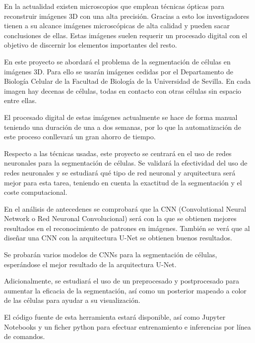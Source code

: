 
En la actualidad existen microscopios que emplean técnicas ópticas para reconstruir imágenes 3D con una alta precisión. Gracias a esto los investigadores tienen a su alcance imágenes microscópicas de alta calidad y pueden sacar conclusiones de ellas. Estas imágenes suelen requerir un procesado digital con el objetivo de discernir los elementos importantes del resto.

En este proyecto se abordará el problema de la segmentación de células en imágenes 3D. Para ello se usarán imágenes  cedidas por el Departamento de Biología Celular de la Facultad de Biología de la Universidad de Sevilla. En cada imagen hay decenas de células, todas en contacto con otras células sin espacio entre ellas.

El procesado digital de estas imágenes actualmente se hace de forma manual teniendo una duración de una a dos semanas, por lo que la automatización de este proceso conllevará un gran ahorro de tiempo.

Respecto a las técnicas usadas, este proyecto se centrará en el uso de redes neuronales para la segmentación de células. Se validará la efectividad del uso de redes neuronales y se estudiará qué tipo de red neuronal y arquitectura será mejor para esta tarea, teniendo en cuenta la exactitud de la segmentación y el coste computacional.

En el análisis de antecedenes se comprobará que la CNN (Convolutional Neural Network o Red Neuronal Convolucional) será con la que se obtienen mejores resultados en el reconocimiento de patrones en imágenes. También se verá que al diseñar una CNN con la arquitectura U-Net se obtienen buenos resultados.

Se probarán varios modelos de CNNs para la segmentación de células, esperándose el mejor resultado de la arquitectura U-Net.

Adicionalmente, se estudiará el uso de un preprocesado y postprocesado para aumentar la eficacia de la segmentación, así como un posterior mapeado a color de las células para ayudar a su visualización.

El código fuente de esta herramienta estará disponible, así como Jupyter Notebooks y un ficher python para efectuar entrenamiento e inferencias por línea de comandos.
